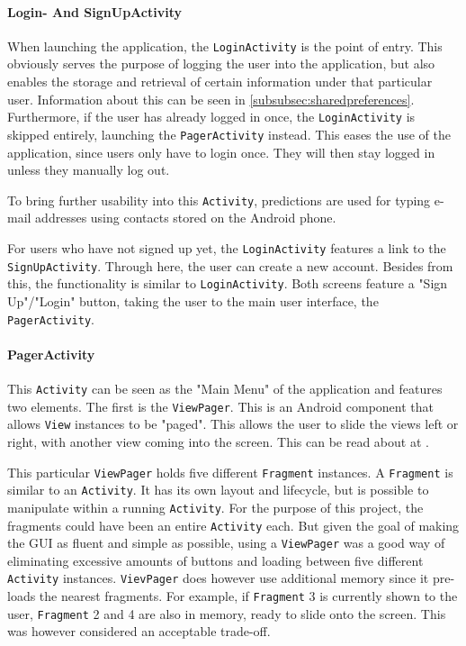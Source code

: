 \paragraph{Login- And SignUpActivity}
When launching the application, the \texttt{LoginActivity} is the point of entry. This obviously serves the purpose of logging the user into the application, but also enables the storage and retrieval of certain information under that particular user. Information about this can be seen in 
\ref{subsubsec:sharedpreferences}. Furthermore, if the user has already logged in once, the \texttt{LoginActivity} is skipped entirely, launching the \texttt{PagerActivity} instead. This eases the use of the application, since users only have to login once. They will then stay logged in unless they manually log out.

To bring further usability into this \texttt{Activity}, predictions are used for typing e-mail addresses using contacts stored on the Android phone.

For users who have not signed up yet, the \texttt{LoginActivity} features a link to the \texttt{SignUpActivity}. Through here, the user can create a new account. Besides from this, the functionality is similar to \texttt{LoginActivity}. Both screens feature a "Sign Up"/"Login" button, taking the user to the main user interface, the \texttt{PagerActivity}.

\paragraph{PagerActivity}
This \texttt{Activity} can be seen as the "Main Menu" of the application and features two elements. The first is the \texttt{ViewPager}. This is an Android component that allows \texttt{View} instances to be "paged". This allows the user to slide the views left or right, with another view coming into the screen. This can be read about at \citep{viewpager}.

This particular \texttt{ViewPager} holds five different \texttt{Fragment} instances. A \texttt{Fragment} is similar to an \texttt{Activity}. It has its own layout and lifecycle, but is possible to manipulate within a running \texttt{Activity}.\citep{fragment} For the purpose of this project, the fragments could have been an entire \texttt{Activity} each. But given the goal of making the GUI as fluent and simple as possible, using a \texttt{ViewPager} was a good way of eliminating excessive amounts of buttons and loading between five different \texttt{Activity} instances. \texttt{VievPager} does however use additional memory since it pre-loads the nearest fragments. For example, if \texttt{Fragment} 3 is currently shown to the user, \texttt{Fragment} 2 and 4 are also in memory, ready to slide onto the screen. This was however considered an acceptable trade-off.


